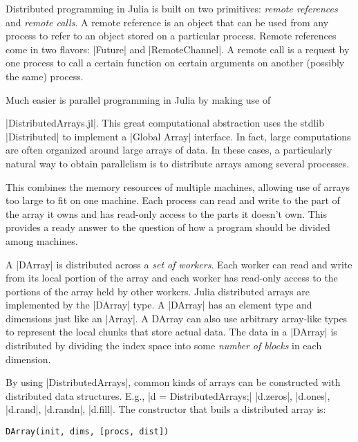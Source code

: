 Distributed programming in Julia is built on two primitives: \emph{remote references} and \emph{remote calls}. A remote reference is an object that can be used from any process to refer to an object stored on a particular process. Remote references come in two flavors: |Future| and |RemoteChannel|.
A remote call is a request by one process to call a certain function on certain arguments on another (possibly the same) process.

Much easier is parallel programming in Julia by making use of

|DistributedArrays.jl|. This great computational abstraction uses the stdlib |Distributed| to implement a |Global Array| interface. 
In fact, large computations are often organized around large arrays of data. In these cases, a particularly natural way to obtain parallelism is to distribute arrays among several processes. 

This combines the memory resources of multiple machines, allowing use of arrays too large to fit on one machine. Each process can read and write to the part of the array it owns and has read-only access to the parts it doesn't own. This provides a ready answer to the question of how a program should be divided among machines.

A |DArray| is distributed across a \emph{set of workers}. Each worker can read and write from its local portion of the array and each worker has read-only access to the portions of the array held by other workers.
Julia distributed arrays are implemented by the |DArray| type. A |DArray| has an element type and dimensions just like an |Array|. A DArray can also use arbitrary array-like types to represent the local chunks that store actual data. The data in a |DArray| is distributed by dividing the index space into some \emph{number of blocks} in each dimension.

By using |DistributedArrays|, common kinds of arrays can be constructed with distributed data structures. E.g., |d = DistributedArrays;| 
|d.zeros|, |d.ones|, |d.rand|, |d.randn|, |d.fill|. The constructor that buils a distributed array is:

\begin{lstlisting}[language=JuliaLocal, style=julia, mathescape=false]
  DArray(init, dims, [procs, dist])
\end{lstlisting}


